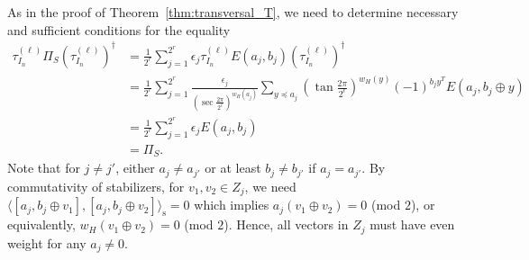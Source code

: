 \documentclass[twoside,romanappendices]{IEEEtran}
\newcommand{\syminn}[2]{\langle #1, #2 \rangle_{\text{s}}}
\begin{document}
As in the proof of Theorem~\ref{thm:transversal_T}, we need to determine necessary and sufficient conditions for the equality
\begin{align}
\tau_{I_n}^{(\ell)} \Pi_S \left( \tau_{I_n}^{(\ell)} \right)^{\dagger} & = \frac{1}{2^r} \sum_{j = 1}^{2^r} \epsilon_j \tau_{I_n}^{(\ell)} E(a_j,b_j) \left( \tau_{I_n}^{(\ell)} \right)^{\dagger} \\
%
  & = \frac{1}{2^r} \sum_{j = 1}^{2^r} \frac{\epsilon_j}{\left( \sec\frac{2\pi}{2^\ell} \right)^{w_H(a_j)}} \sum_{y \preceq a_j} \left( \tan\frac{2\pi}{2^\ell} \right)^{w_H(y)} (-1)^{b_j y^T} E(a_j, b_j \oplus y) \\
%
  & = \frac{1}{2^r} \sum_{j = 1}^{2^r} \epsilon_j E(a_j,b_j) \\
%
  & = \Pi_S.
\end{align}
Note that for $j \neq j'$, either $a_j \neq a_{j'}$ or at least $b_j \neq b_{j'}$ if $a_j = a_{j'}$.
By commutativity of stabilizers, for $v_1, v_2 \in Z_j$, we need $\syminn{[a_j, b_j \oplus v_1]}{[a_j, b_j \oplus v_2]} = 0$ which implies $a_j(v_1 \oplus v_2) = 0$ (mod $2$), or equivalently, $w_H(v_1 \oplus v_2) = 0$ (mod $2$).
Hence, all vectors in $Z_j$ must have even weight for any $a_j \neq 0$.
\end{document}

